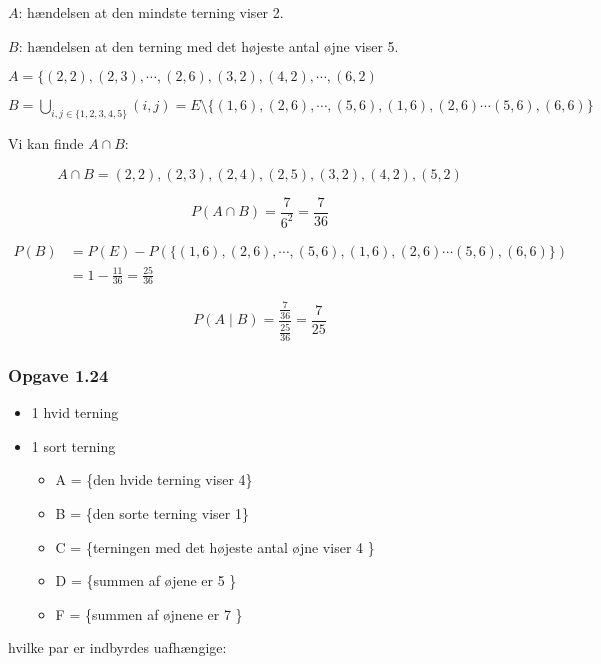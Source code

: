 $A$: hændelsen at den mindste terning viser 2.

$B$: hændelsen at den terning med det højeste antal øjne viser 5.

$A = \{(2,2),(2,3),\cdots, (2,6), (3,2), (4,2), \cdots, (6,2)$

$B = \bigcup_{i,j \in \{1,2,3,4,5\}} (i,j) =  E \setminus \{(1,6),(2,6),\cdots,(5,6),(1,6),(2,6) \cdots (5,6),(6,6) \} $

Vi kan finde $A\cap B$:

\begin{equation}
    A \cap B = (2,2), (2,3),(2,4),(2,5),(3,2),(4,2),(5,2)
\end{equation}

\begin{equation}
    P(A \cap B) = \frac{7}{6^2}= \frac{7}{36}
\end{equation}

\begin{align}
    P(B) &= P(E) - P(\{(1,6),(2,6),\cdots,(5,6),(1,6),(2,6) \cdots (5,6),(6,6) \}) \\ &= 1 - \frac{11}{36} = \frac{25}{36}
\end{align}

\begin{equation}
    P(A \mid B) = \frac{\frac{7}{36}}{\frac{25}{36}} = \frac{7}{25}
\end{equation}

\subsubsection{Opgave 1.24}

\begin{itemize}
    \item 1 hvid terning
    \item 1 sort terning
    \begin{itemize}
        \item A = \{den hvide terning viser 4\}
        \item B = \{den sorte terning viser 1\}
        \item C = \{terningen med det højeste antal øjne viser 4 \}
        \item D = \{summen af øjene er 5 \}
        \item F = \{summen af øjnene er 7 \}
    \end{itemize}
\end{itemize}

hvilke par er indbyrdes uafhængige:

